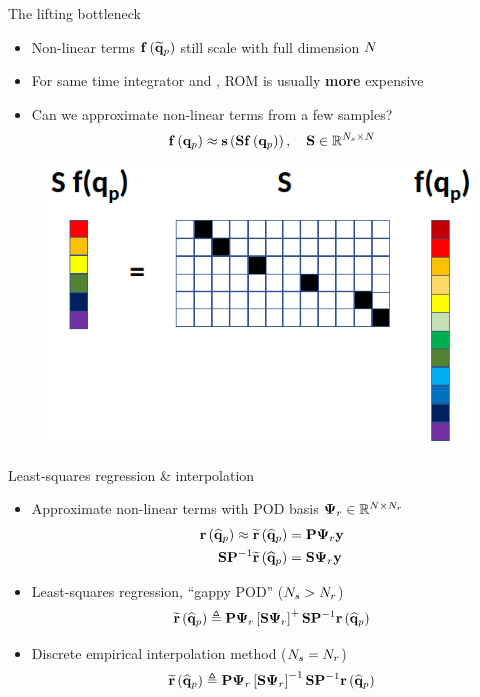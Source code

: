\documentclass[]{beamer}
\begin{document}
\begin{frame}{The lifting bottleneck}
    \begin{itemize}
		\item Non-linear terms $\mathbf{f} \left(\mathbf{\widetilde{q}}_p\right)$ still scale with full dimension $N$
		\item For same time integrator and \dt, ROM is usually \textbf{more} expensive
		\item Can we approximate non-linear terms from a few samples?
		\begin{equation*}
			\mathbf{f} \left(\mathbf{q}_p\right) \approx \mathbf{s}\left(\mathbf{S} \mathbf{f} \left(\mathbf{q}_p\right)\right), \quad \mathbf{S} \in \mathbb{R}^{N_s \times N}
		\end{equation*}
	\end{itemize}
	\vspace{1em}
	\begin{figure}
		\centering
		\includegraphics[width=0.55\linewidth]{theory/samplingHelperVis.png}
	\end{figure}
\end{frame}

\begin{frame}{Least-squares regression \& interpolation}
    \begin{itemize}
		\item Approximate non-linear terms with POD basis $\deimBasisRes \in \mathbb{R}^{\numDOF \times \numResModes}$
		\begin{align*}
			\resFunc{\primVecCoef} \approx \resApproxFunc{\primVecCoef} &= \consScale \deimBasisRes \dummyVec \\
			\sampMat \consScaleInv \resApproxFunc{\primVecCoef} &= \sampMat \deimBasisRes \dummyVec
		\end{align*}
		\item Least-squares regression, ``gappy POD'' ($N_s > N_r$)
		\begin{equation*}
			\resApproxFunc{\primVecCoef} \triangleq \consScale \deimBasisRes \left[ \sampMat \deimBasisRes \right]^{+} \sampMat \consScaleInv \resFunc{\primVecCoef}
		\end{equation*}
		\item Discrete empirical interpolation method ($N_s = N_r$)
		\begin{equation*}
			\resApproxFunc{\primVecCoef} \triangleq \consScale \deimBasisRes \left[ \sampMat \deimBasisRes \right]^{-1} \sampMat \consScaleInv \resFunc{\primVecCoef}
		\end{equation*}
	\end{itemize}
\end{frame}
\end{document}
